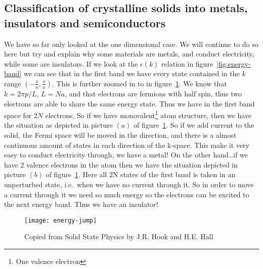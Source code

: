\documentclass[11pt]{article}
\begin{document}
\subsection{Classification of crystalline solids into metals, insulators and semiconductors}
We have so far only looked at the one dimensional case. We will continue to do so here but try and explain why some materials are metals, and conduct electricity, while some are insulators. If we look at the $\epsilon(k)$ relation in figure~\ref{fig:energy-band} we can see that in the first band we have every state contained in the $k$ range $(-\frac{\pi}{a},\frac{\pi}{a})$. This is further zoomed in to in figure~\ref{fig:energy-jump}. We know that $k = 2 \pi p /L$, $L = Na$, and that electrons are fermions with half spin, thus two electrons are able to share the same energy state. Thus we have in the first band space for $2N$ electrons. So if we have monovalent\footnote{One valence electron} atom structure, then we have the situation as depicted in picture $(a)$ of figure~\ref{fig:energy-jump}. So if we add current to the solid, the Fermi space will be moved in the direction, and there is a almost continuous amount of states in each direction of the k-space. This make it very easy to conduct electricity through, we have a metal! On the other hand\ldots if we have 2 valence electrons in the atom then we have the situation depicted in picture $(b)$ of figure~\ref{fig:energy-jump}. Here all 2N states of the first band is taken in an unperturbed state, i.e.\ when we have no current through it. So in order to move a current through it we need so much energy so the electrons can be excited to the next energy band. Thus we have an insulator!
\begin{figure}[!ht]
	\centering
	\texttt{[image: energy-jump]}
	\caption{Copied from Solid State Physics by J.R. Hook and H.E. Hall}
	\label{fig:energy-jump}
\end{figure}
\end{document}
